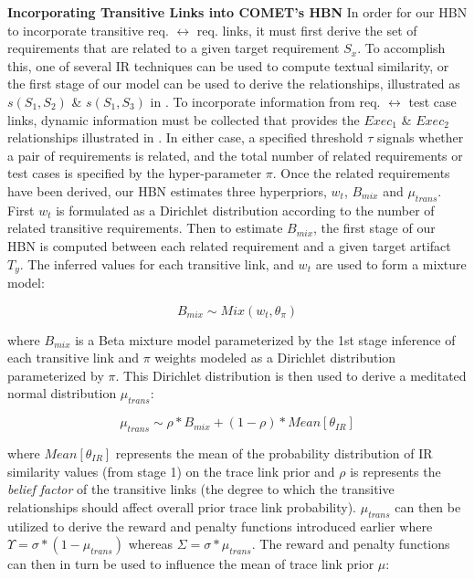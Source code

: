 {\textbf{Incorporating Transitive Links into C{\footnotesize OMET}'s HBN}} In order for our HBN to incorporate transitive req. $\leftrightarrow$ req. links, it must first derive the set of requirements that are related to a given target requirement $S_x$. To accomplish this, one of several IR techniques can be used to compute textual similarity, or the first stage of our model can be used to derive the relationships, illustrated as $s(S_1,S_2)$ \& $s(S_1,S_3)$ in . To incorporate information from req. $\leftrightarrow$ test case links, dynamic information must be collected that provides the $Exec_1$ \& $Exec_2$ relationships illustrated in . In either case, a specified threshold $\tau$ signals whether a pair of requirements is related, and the total number of related requirements or test cases is specified by the hyper-parameter $\pi$.  Once the related requirements have been derived, our HBN estimates three hyperpriors, $w_t$, $B_{mix}$ and $\mu_{trans}$. First $w_t$ is formulated as a Dirichlet distribution according to the number of related transitive requirements. Then to estimate $B_{mix}$, the first stage of our HBN is computed between each related requirement and a given target artifact $T_y$. The inferred values for each transitive link, and $w_t$ are used to form a mixture model:

\begin{equation}
	B_{mix} \sim Mix(w_t,\theta_\pi)
\end{equation}

\noindent where $B_{mix}$ is a Beta mixture model parameterized by the 1st stage inference of each transitive link and $\pi$ weights modeled as a Dirichlet distribution parameterized by $\pi$. This Dirichlet distribution is then used to derive a meditated normal distribution $\mu_{trans}$:

\begin{equation}
	\mu_{trans} \sim \rho*B_{mix} + (1-\rho)*Mean[\theta_{IR}]
\end{equation}

\noindent where $Mean[\theta_{IR}]$ represents the mean of the probability distribution of IR similarity values (from stage 1) on the trace link prior and $\rho$ is represents the \textit{belief factor} of the transitive links (\eg the degree to which the transitive relationships should affect overall prior trace link probability). $\mu_{trans}$ can then be utilized to derive the reward and penalty functions introduced earlier where $\Upsilon = \sigma*(1-\mu_{trans})$ whereas $\Sigma = \sigma*\mu_{trans}$. The reward and penalty functions can then in turn be used to influence the mean of trace link prior $\mu$:

